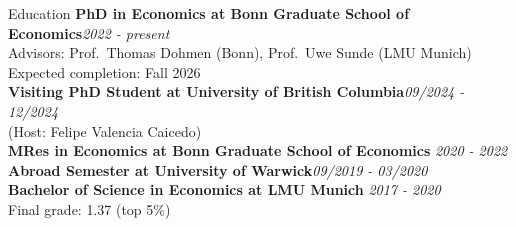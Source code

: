 \documentclass[roman]{resume}
\begin{document}
	
	\begin{rSection}{Education}
		\textbf{PhD in Economics at Bonn Graduate School of Economics}\hfill \normalfont\textit{2022 - present}\\
		Advisors: Prof.\ Thomas Dohmen (Bonn), Prof.\ Uwe Sunde (LMU Munich)\\
		Expected completion: Fall 2026\\[1.5ex]
		\textbf{Visiting PhD Student at University of British Columbia}\hfill \normalfont\textit{09/2024 - 12/2024}\\
		(Host: Felipe Valencia Caicedo)\\[1.5ex]
		\textbf{MRes in Economics at Bonn Graduate School of Economics} \hfill \normalfont\textit{2020 - 2022}\\ [1.5ex]
		\textbf{Abroad Semester at University of Warwick}\hfill \textit{09/2019 - 03/2020}\\[1.5ex]
		\textbf{Bachelor of Science in Economics at LMU Munich}  \hfill \textit{2017 - 2020}\\
		Final grade: 1.37 (top 5\%)

	\end{rSection}
	
\end{document}
